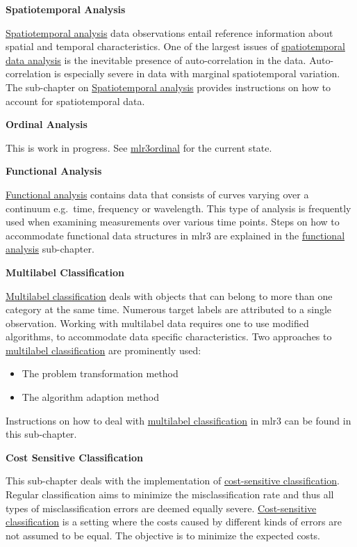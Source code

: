 \documentclass[
]{scrbook}
\providecommand{\tightlist}{%
  \setlength{\itemsep}{0pt}\setlength{\parskip}{0pt}}
\begin{document}
\textbf{Spatiotemporal Analysis}

\protect\hyperlink{spatiotemporal}{Spatiotemporal analysis} data observations entail reference information about spatial and temporal characteristics.
One of the largest issues of \protect\hyperlink{spatiotemporal}{spatiotemporal data analysis} is the inevitable presence of auto-correlation in the data.
Auto-correlation is especially severe in data with marginal spatiotemporal variation.
The sub-chapter on \protect\hyperlink{spatiotemporal}{Spatiotemporal analysis} provides instructions on how to account for spatiotemporal data.

\textbf{Ordinal Analysis}

This is work in progress.
See \href{https://github.com/mlr-org/mlr3ordinal}{mlr3ordinal} for the current state.

\textbf{Functional Analysis}

\protect\hyperlink{functional}{Functional analysis} contains data that consists of curves varying over a continuum e.g.~time, frequency or wavelength.
This type of analysis is frequently used when examining measurements over various time points.
Steps on how to accommodate functional data structures in mlr3 are explained in the \protect\hyperlink{functional}{functional analysis} sub-chapter.

\textbf{Multilabel Classification}

\protect\hyperlink{multilabel}{Multilabel classification} deals with objects that can belong to more than one category at the same time.
Numerous target labels are attributed to a single observation.
Working with multilabel data requires one to use modified algorithms, to accommodate data specific characteristics.
Two approaches to \protect\hyperlink{multilabel}{multilabel classification} are prominently used:

\begin{itemize}
\tightlist
\item
  The problem transformation method
\item
  The algorithm adaption method
\end{itemize}

Instructions on how to deal with \protect\hyperlink{multilabel}{multilabel classification} in mlr3 can be found in this sub-chapter.

\textbf{Cost Sensitive Classification}

This sub-chapter deals with the implementation of \protect\hyperlink{cost-sens}{cost-sensitive classification}.
Regular classification aims to minimize the misclassification rate and thus all types of misclassification errors are deemed equally severe.
\protect\hyperlink{cost-sens}{Cost-sensitive classification} is a setting where the costs caused by different kinds of errors are not assumed to be equal.
The objective is to minimize the expected costs.
\end{document}
